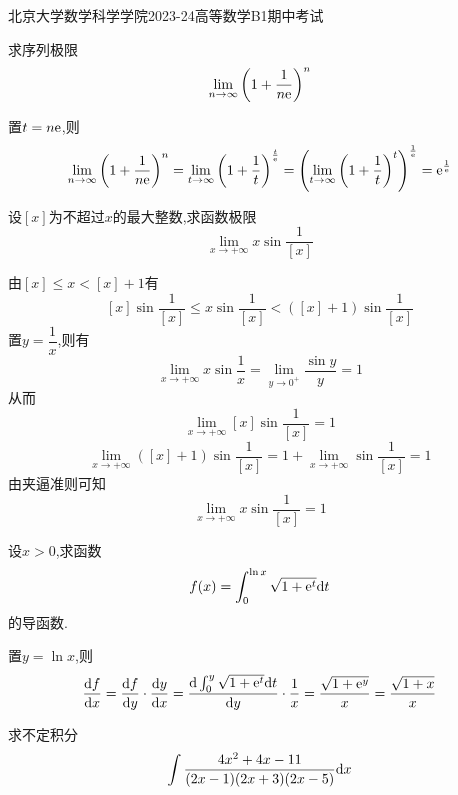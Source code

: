 \documentclass{ctexart}
\begin{document}
\pagestyle{empty}
\begin{center}\Large
    北京大学数学科学学院2023-24高等数学B1期中考试
\end{center}
\begin{problem}[1.(10\songti{分})]
    求序列极限$$\lim_{n\to\infty}{\left(1+\dfrac{1}{n\mathrm{e}}\right)^n}$$
\end{problem}
\begin{solution}[Solution.]
    置$t=n\mathrm{e}$,则
    $$
    \lim_{n\to\infty}{\left(1+\dfrac{1}{n\mathrm{e}}\right)^n}
    =\lim_{t\to\infty}{\left(1+\dfrac{1}{t}\right)^{\frac{t}{\mathrm{e}}}}
    =\left(\lim_{t\to\infty}{\left(1+\dfrac{1}{t}\right)^t}\right)^{\frac{1}{\mathrm{e}}}
    =\mathrm{e}^{\frac{1}{\mathrm{e}}}
    $$
\end{solution}
\begin{problem}[2.(10\songti{分})]
    设$[x]$为不超过$x$的最大整数,求函数极限$$\lim_{x\to+\infty}{x\sin{\dfrac{1}{[x]}}}$$
\end{problem}
\begin{solution}[Solution.]
    由$[x]\leqslant x<[x]+1$有
    $$[x]\sin{\dfrac{1}{[x]}}\leqslant x\sin{\dfrac{1}{[x]}}<([x]+1)\sin{\dfrac{1}{[x]}}$$
    置$y=\dfrac{1}{x}$,则有$$\lim_{x\to+\infty}{x\sin{\dfrac{1}{x}}}=\lim_{y\to 0^+}{\dfrac{\sin y}{y}}=1$$
    从而$$\lim_{x\to+\infty}{[x]\sin{\dfrac{1}{[x]}}}=1$$
    $$\lim_{x\to+\infty}{([x]+1)\sin{\dfrac{1}{[x]}}}=1+\lim_{x\to+\infty}{\sin{\dfrac{1}{[x]}}}=1$$
    由夹逼准则可知$$\lim_{x\to+\infty}{x\sin{\dfrac{1}{[x]}}}=1$$
\end{solution}
\begin{problem}[3.(10\songti{分})]
    设$x>0$,求函数$$f(x)=\int_{0}^{\ln{x}}{\sqrt{1+\mathrm{e}^t}\mathrm{d} t}$$的导函数.
\end{problem}
\begin{solution}[Solution.]
    置$y=\ln{x}$,则
    $$\dfrac{\mathrm{d} f}{\mathrm{d} x}=\dfrac{\mathrm{d} f}{\mathrm{d} y}\cdot\dfrac{\mathrm{d} y}{\mathrm{d} x}
    =\dfrac{\mathrm{d}\int_{0}^{y}{\sqrt{1+\mathrm{e}^t}\mathrm{d} t}}{\mathrm{d} y}\cdot\dfrac{1}{x}
    =\dfrac{\sqrt{1+\mathrm{e}^y}}{x}=\dfrac{\sqrt{1+x}}{x}$$
\end{solution}
\begin{problem}[4.(10\songti{分})]
    求不定积分$$\int{\dfrac{4x^2+4x-11}{(2x-1)(2x+3)(2x-5)}\mathrm{d}x}$$
\end{problem}
\end{document}
